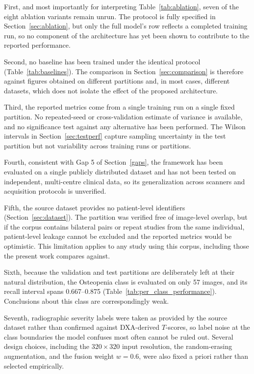 \documentclass[journal]{IEEEtran}
\begin{document}
First, and most importantly for interpreting Table~\ref{tab:ablation}, seven of
the eight ablation variants remain unrun. The protocol is fully specified in
Section~\ref{sec:ablation}, but only the full model's row reflects a completed
training run, so no component of the architecture has yet been shown to
contribute to the reported performance.

Second, no baseline has been trained under the identical protocol
(Table~\ref{tab:baselines}). The comparison in Section~\ref{sec:comparison} is
therefore against figures obtained on different partitions and, in most cases,
different datasets, which does not isolate the effect of the proposed
architecture.

Third, the reported metrics come from a single training run on a single fixed
partition. No repeated-seed or cross-validation estimate of variance is
available, and no significance test against any alternative has been performed.
The Wilson intervals in Section~\ref{sec:testperf} capture sampling uncertainty
in the test partition but not variability across training runs or partitions.

Fourth, consistent with Gap 5 of Section~\ref{gaps}, the framework has been
evaluated on a single publicly distributed dataset \cite{gobara2024multiclass}
and has not been tested on independent, multi-centre clinical data, so its
generalization across scanners and acquisition protocols is unverified.

Fifth, the source dataset provides no patient-level identifiers
(Section~\ref{sec:dataset}). The partition was verified free of image-level
overlap, but if the corpus contains bilateral pairs or repeat studies from the
same individual, patient-level leakage cannot be excluded and the reported
metrics would be optimistic. This limitation applies to any study using this
corpus, including those the present work compares against.

Sixth, because the validation and test partitions are deliberately left at their
natural distribution, the Osteopenia class is evaluated on only 57 images, and
its recall interval spans 0.667--0.875 (Table~\ref{tab:per_class_performance}).
Conclusions about this class are correspondingly weak.

Seventh, radiographic severity labels were taken as provided by the source
dataset rather than confirmed against DXA-derived $T$-scores, so label noise at
the class boundaries the model confuses most often cannot be ruled out. Several
design choices, including the $320\times320$ input resolution, the random-erasing
augmentation, and the fusion weight $w = 0.6$, were also fixed a priori rather
than selected empirically.
\end{document}
